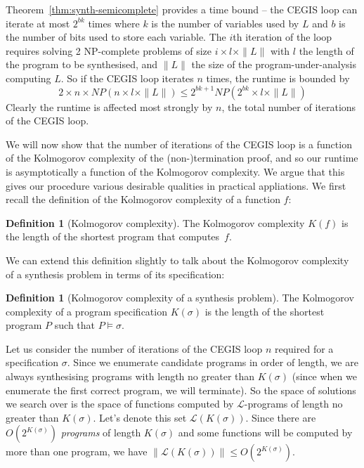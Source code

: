 \documentclass[preprint]{sigplanconf}
\theoremstyle{definition}
\newtheorem{definition}[theorem]{Definition}
\begin{document}
Theorem~\ref{thm:synth-semicomplete} provides a time bound -- the CEGIS loop can iterate at most
$2^{bk}$ times where $k$ is the number of variables used by $L$ and
$b$ is the number of bits used to store each variable.
The $i$th iteration of the loop requires solving 2 NP-complete problems of size $i \times l \times \| L\|$
with $l$ the length of the program to be synthesised, and $\| L \| $ the size of the program-under-analysis
computing $ L $.  So if
the CEGIS loop iterates $n$ times, the
runtime is bounded by
$$2 \times n \times NP(n \times l \times \| L \|) \leq 2^{bk + 1} NP(2^{bk} \times l \times \| L \|)$$
Clearly the runtime is affected most strongly by $n$, the total number of iterations of the CEGIS loop.

We will now show that the number of iterations of the CEGIS loop is a function
of the Kolmogorov complexity of the (non-)termination proof, and so
our runtime is asymptotically a function of the Kolmogorov complexity.
We argue that this gives our procedure various desirable qualities in practical
appliations.
We first recall the definition of the Kolmogorov complexity
of a function $f$:

\begin{definition}[Kolmogorov complexity]
 The Kolmogorov complexity $K(f)$ is the length of the shortest program that
 computes~$f$.
\end{definition}

We can extend this definition slightly to talk about the Kolmogorov complexity of a
synthesis problem in terms of its specification:

\begin{definition}[Kolmogorov complexity of a synthesis problem]
 The Kolmogorov complexity of a program specification $K(\sigma)$ is the length of the shortest
 program $P$ such that $P \models \sigma$.
\end{definition}

Let us consider the number of iterations of the CEGIS loop $n$ required for a specification
$\sigma$.  Since we enumerate candidate programs in order of length, we are always synthesising
programs with length no greater than $K(\sigma)$ (since when we enumerate the first correct program,
we will terminate).  So the space of solutions we search over is the space
of functions computed by $\mathcal{L}$-programs of length no greater than $K(\sigma)$.  Let's
denote this set $\mathcal{L}(K(\sigma))$.
Since there are $O(2^{K(\sigma)})$ \emph{programs} of length $K(\sigma)$ and some functions
will be computed by more than one program, we have $\| \mathcal{L}(K(\sigma)) \| \leq O(2^{K(\sigma)})$.
\end{document}

